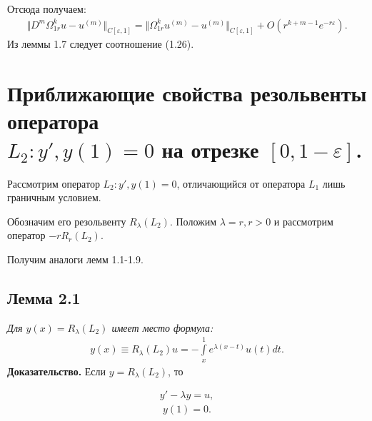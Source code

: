 Отсюда получаем:
\begin{equation}
\begin{array}{c}
\nonumber

\Vert D^m\Omega_{1r}^ku - u^{(m)} \Vert_{C[\varepsilon ,1]} = \Vert \Omega_{1r}^ku^{(m)} - u^{(m)} \Vert_{C[\varepsilon ,1]} + O(r^{k+m-1}e^{-r\varepsilon}).

\end{array}
\end{equation}
Из леммы 1.7 следует соотношение (1.26).

\chapter{Приближающие свойства резольвенты оператора \\ $ L_2:y', y(1)=0 $ на отрезке $ [0, 1 - \varepsilon] $.}
Рассмотрим оператор $ L_2: y', y(1) = 0 $, отличающийся от оператора $ L_1 $ лишь граничным условием.

Обозначим его резольвенту $R_\lambda(L_2)$. Положим $ \lambda = r, r > 0 $ и рассмотрим оператор $ -rR_r(L_2) $.

Получим аналоги лемм 1.1-1.9.

\section{Лемма 2.1}
\label{lemma2.1} 
\textit{Для $ y(x) = R_\lambda(L_2) $ имеет место формула:}
\begin{equation}
\begin{array}{c}

y(x) \equiv R_\lambda(L_2)u = -\int\limits_x^1 e^{\lambda (x-t)}u(t)dt.

\end{array}
\end{equation}
\textbf{Доказательство.} Если $ y = R_\lambda(L_2) $, то

\begin{equation}
\begin{array}{c}

y' - \lambda y = u,

\end{array}
\end{equation}
\begin{equation}
\begin{array}{c}

y(1) = 0.

\end{array}
\end{equation}

